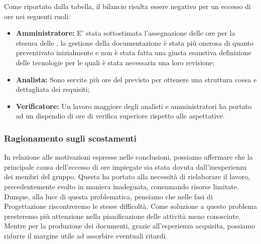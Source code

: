 Come riportato dalla tabella, il bilancio risulta essere negativo per un eccesso di ore nei seguenti ruoli:

\begin{itemize}
	\item \textbf{Amministratore:} E' stata sottostimata l'assegnazione delle ore per la stesura delle \NdP{}, la gestione della documentazione è stata più onerosa di quanto preventivato inizialmente e non è stata fatta una giusta esaustiva definizione delle tecnologie per le quali è stata necessaria una loro revisione;
	\item \textbf{Analista:} Sono servite più ore del previsto per ottenere una struttura coesa e dettagliata dei requisiti;
	\item \textbf{Verificatore:} Un lavoro maggiore degli analisti e amministratori ha portato ad un dispendio di ore di verifica superiore rispetto alle aspettative.
\end{itemize}
\subsubsection{Ragionamento sugli scostamenti}

In relazione alle motivazioni espresse nelle conclusioni, possiamo affermare che la principale causa dell'eccesso di ore impiegate sia stata dovuta dall'inesperienza dei membri del gruppo. Questa ha portato alla necessità di rielaborare il lavoro, precedentemente svolto in maniera inadeguata, consumando risorse limitate.
Dunque, alla luce di questa problematica, pensiamo che nelle fasi di Progettazione riscontreremo le stesse difficoltà. Come soluzione a questo problema presteremo più attenzione nella pianificazione delle attività meno conosciute. Mentre per la produzione dei documenti, grazie all'esperienza acquisita, possiamo ridurre il margine utile ad assorbire eventuali ritardi.

